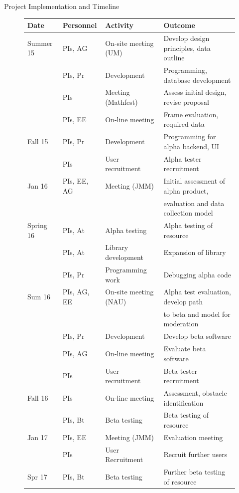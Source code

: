 \documentclass[11pt]{article}
\begin{document}
\begin{section}{Project Implementation and Timeline}
\begin{figure}
\begin{center}
\begin{tabular}{|l|l|l|l|}
  \hline
  \textbf{Date} & \textbf{Personnel} & \textbf{Activity} & \textbf{Outcome}\\
  \hline
  \hline
  Summer 15 & PIs, AG & On-site meeting (UM) & Develop design
        principles, data outline \\
	    & PIs, Pr & Development & Programming, database development \\
	    & PIs & Meeting (Mathfest) & Assess initial design,
        revise proposal \\
            & PIs, EE & On-line meeting & Frame evaluation, required data \\
  \hline
  Fall 15 & PIs, Pr & Development & Programming for alpha backend, UI \\
	  & PIs & User recruitment & Alpha tester recruitment \\
  \hline
  Jan 16 & PIs, EE, AG & Meeting (JMM) & Initial assessment of alpha
	product,\\
        & & & evaluation and data collection model \\
  \hline
  Spring 16 & PIs, At & Alpha testing & Alpha testing of resource \\ 
	    & PIs, At & Library development & Expansion of library \\
            & PIs, Pr & Programming work & Debugging alpha code \\
  \hline 
  Sum 16 & PIs, AG, EE & On-site meeting (NAU) & Alpha test
	evaluation, develop path \\
        & & & to beta and model for moderation \\
	    & PIs, Pr & Development & Develop beta software \\
	    & PIs, AG & On-line meeting & Evaluate beta software \\
	    & PIs & User recruitment & Beta tester recruitment \\
  \hline
  Fall 16 & PIs & On-line meeting  & Assessment, obstacle
	identification\\
	    & PIs, Bt & Beta testing & Beta testing of resource \\
  \hline
  Jan 17 & PIs, EE & Meeting (JMM) & Evaluation meeting \\
	    & PIs & User Recruitment & Recruit further users \\
  \hline
  Spr 17 & PIs, Bt & Beta testing & Further beta testing of resource \\

\end{tabular}
\end{center}
\end{figure}
\end{section}
\end{document}
